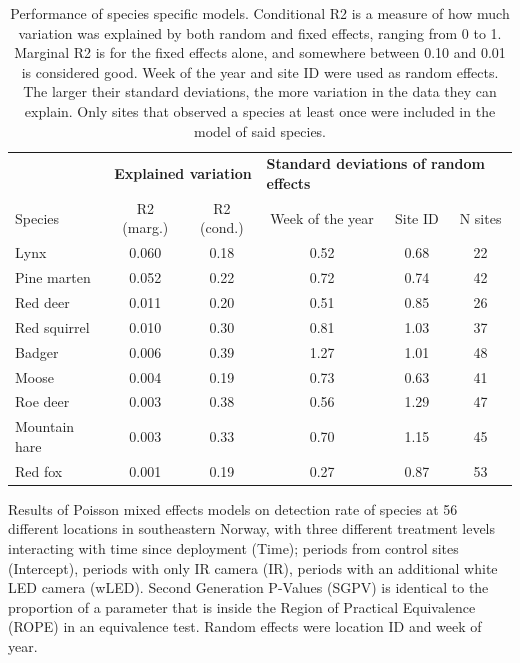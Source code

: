 \begin{table}[h]
	\centering
	\caption[Model performance]%
	{\scriptsize Performance of species specific models. Conditional R2 is a measure of how much variation was explained by both random and fixed effects, ranging from 0 to 1. Marginal R2 is for the fixed effects alone, and somewhere between 0.10 and 0.01 is considered good. Week of the year and site ID were used as random effects. The larger their standard deviations, the more variation in the data they can explain. Only sites that observed a species at least once were included in the model of said species.}
\label{r2}
\footnotesize 
\begin{tabular}{lccccc}
	\toprule
	&\multicolumn{2}{c}{\bfseries Explained variation} & \multicolumn{3}{l}{\bfseries Standard deviations of random effects }	\\
Species & R2 (marg.) & R2 (cond.) & Week of the year & Site ID & N sites \\
	\midrule
    Lynx        & 0.060 & 0.18 & 0.52 & 0.68 & 22 \\  %
    Pine marten & 0.052 & 0.22 & 0.72 & 0.74 & 42 \\  %
    Red deer    & 0.011 & 0.20 & 0.51 & 0.85 & 26 \\  %
 Red squirrel   & 0.010 & 0.30 & 0.81 & 1.03 & 37 \\  %
    Badger      & 0.006 & 0.39 & 1.27 & 1.01 & 48 \\  %
    Moose       & 0.004 & 0.19 & 0.73 & 0.63 & 41 \\  %
    Roe deer    & 0.003 & 0.38 & 0.56 & 1.29 & 47 \\  %
 Mountain hare  & 0.003 & 0.33 & 0.70 & 1.15 & 45 \\  %
    Red fox	    & 0.001 & 0.19 & 0.27 & 0.87 & 53 \\  %
    
    
 \bottomrule
\end{tabular}
\end{table}


\clearpage

\begin{table}[ht]  %
\caption[Model results]
{ \scriptsize \renewcommand{\baselinestretch}{1} 
Results of Poisson mixed effects models on detection rate of species at 56 different locations in southeastern Norway, with three different treatment levels interacting with time since deployment (Time); periods from control sites (Intercept), periods with only IR camera (IR), periods with an additional white LED camera (wLED). Second Generation P-Values (SGPV) is identical to the proportion of a parameter that is inside the Region of Practical Equivalence (ROPE) in an equivalence test. Random effects were location ID and week of year.
}
\label{tab:param}

\end{table}

